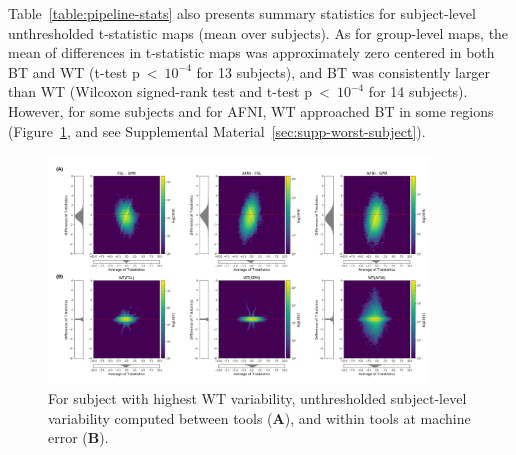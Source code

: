 Table~\ref{table:pipeline-stats} also presents summary statistics for
subject-level unthresholded t-statistic maps (mean over subjects).
As for group-level maps, the mean of differences in t-statistic maps was
approximately zero centered in both BT and WT (t-test p~\textless~$10^{-4}$ for 13 subjects),
and BT was consistently larger than WT (Wilcoxon
signed-rank test and t-test p~\textless~$10^{-4}$ for 14 subjects).
However, for some subjects and for AFNI, WT approached 
BT in some regions (Figure~\ref{fig:unthresh-maps-sbj},
and see Supplemental Material~\ref{sec:supp-worst-subject}).

\begin{figure}[ht]
  \centering
  \includegraphics[width=0.9\textwidth]{chapters/chapter3/figures/unthresh-sbj05.png}
  \caption{For subject with highest WT variability,
    unthresholded subject-level variability computed between tools (\textbf{A}), and within tools at machine error (\textbf{B}).}
  \label{fig:unthresh-maps-sbj}
\end{figure}

